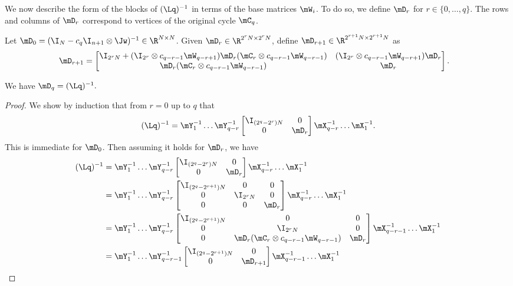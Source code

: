 \documentclass{toc}
\begin{document}
We now describe the form of the blocks of $(\Lq)^{-1}$ in terms of the base matrices $\mW_i$. To do so, we define $\mD_r$ for $r\in \{0,\ldots,q\}$. The rows and columns of $\mD_r$ correspond to vertices of the original cycle $\mC_{q}$. 
\begin{definition}\label{def:D}
Let $\mD_{0}=(\I_N-c_q\I_{n+1}\otimes \Jw)^{-1}\in \R^{N \times N}$. Given $\mD_{r} \in \R^{2^{r}N\times 2^{r}N}$, define $\mD_{r+1}\in\R^{2^{r+1}N\times 2^{r+1}N}$ as
\begin{align*}
    \mD_{r+1} &= \begin{bmatrix}\I_{2^{r}N}+(\I_{2^{r}}\otimes c_{q-r-1}\mW_{q-r+1})\mD_{r}(\mC_{r} \otimes c_{q-r-1}\mW_{q-r-1}) & (\I_{2^r}\otimes c_{q-r-1}\mW_{q-r+1})\mD_{r}\\ \mD_{r}(\mC_{r} \otimes c_{q-r-1}\mW_{q-r-1}) & \mD_{r}\end{bmatrix}.
\end{align*}

\end{definition}
%
\begin{lemma}\label{lem:Dzeroform}
We have $\mD_q=(\Lq)^{-1}.$
\end{lemma}
\begin{proof}
We show by induction that from $r=0$ up to $q$ that
\[(\Lq)^{-1}=\mY_1^{-1}\dots \mY_{q-r}^{-1}\begin{bmatrix}
 \I_{(2^q-2^{r})N} & 0\\ 0 & \mD_r\end{bmatrix}\mX_{q-r}^{-1}\dots\mX_1^{-1}.
\]
This is immediate for $\mD_0$. Then assuming it holds for $\mD_r$, 
we have %
\begin{align*}
    (\Lq)^{-1} &=\mY_1^{-1}\dots \mY_{q-r}^{-1}
    \begin{bmatrix}\I_{(2^q-2^{r})N} & 0\\ 0 & \mD_r\end{bmatrix}
    \mX_{q-r}^{-1}\dots\mX_1^{-1}\\
    &= \mY_1^{-1}\dots \mY_{q-r}^{-1}\begin{bmatrix}
 \I_{(2^q-2^{r+1})N} & 0 & 0\\ 0 & \I_{2^{r}N} & 0\\ 0 & 0 & \mD_r\end{bmatrix}\mX_{q-r}^{-1}\dots\mX_1^{-1}\\
 &= \mY_1^{-1}\dots \mY_{q-r}^{-1}\begin{bmatrix}
 \I_{(2^q-2^{r+1})N} & 0 & 0\\ 0 & \I_{2^{r}N} & 0\\ 0 & \mD_{r}(\mC_{r}\otimes c_{q-r-1}\mW_{q-r-1}) & \mD_r\end{bmatrix}\mX_{q-r-1}^{-1}\dots\mX_1^{-1}\\
 &= \mY_1^{-1}\dots \mY_{q-r-1}^{-1}\begin{bmatrix}
 \I_{(2^q-2^{r+1})N} & 0 \\ 0 & \mD_{r+1} \end{bmatrix}\mX_{q-r-1}^{-1}\dots\mX_1^{-1}\qedhere
\end{align*}
\end{proof}
\end{document}
